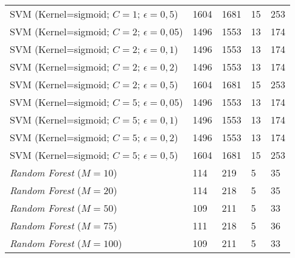 \begin{center}
\begin{longtable}{|l|l|l|l|l|}
SVM (Kernel=sigmoid; $C=1$; $\epsilon=0,5$) & 1604 & 1681 & 15 & 253 \\
SVM (Kernel=sigmoid; $C=2$; $\epsilon=0,05$) & 1496 & 1553 & 13 & 174 \\
SVM (Kernel=sigmoid; $C=2$; $\epsilon=0,1$) & 1496 & 1553 & 13 & 174 \\
SVM (Kernel=sigmoid; $C=2$; $\epsilon=0,2$) & 1496 & 1553 & 13 & 174 \\
SVM (Kernel=sigmoid; $C=2$; $\epsilon=0,5$) & 1604 & 1681 & 15 & 253 \\
SVM (Kernel=sigmoid; $C=5$; $\epsilon=0,05$) & 1496 & 1553 & 13 & 174 \\
SVM (Kernel=sigmoid; $C=5$; $\epsilon=0,1$) & 1496 & 1553 & 13 & 174 \\
SVM (Kernel=sigmoid; $C=5$; $\epsilon=0,2$) & 1496 & 1553 & 13 & 174 \\
SVM (Kernel=sigmoid; $C=5$; $\epsilon=0,5$) & 1604 & 1681 & 15 & 253 \\
\textit{Random Forest} ($M=10$) & 114 & 219 & 5 & 35 \\
\textit{Random Forest} ($M=20$) & 114 & 218 & 5 & 35 \\
\textit{Random Forest} ($M=50$) & 109 & 211 & 5 & 33 \\
\textit{Random Forest} ($M=75$) & 111 & 218 & 5 & 36 \\
\textit{Random Forest} ($M=100$) & 109 & 211 & 5 & 33 \\
\end{longtable}
\end{center}